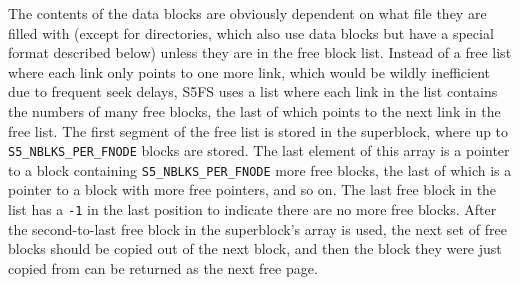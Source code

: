 The contents of the data blocks are obviously dependent on what file they are filled with (except for directories, which also use data blocks but have a special format described below) unless they are in the free block list. Instead of a free list where each link only points to one more link, which would be wildly inefficient due to frequent seek delays, S5FS uses a list where each link in the list contains the numbers of many free blocks, the last of which points to the next link in the free list. The first segment of the free list is stored in the superblock, where up to \texttt{S5\_NBLKS\_PER\_FNODE} blocks are stored. The last element of this array is a pointer to a block containing \texttt{S5\_NBLKS\_PER\_FNODE} more free blocks, the last of which is a pointer to a block with more free pointers, and so on. The last free block in the list has a \texttt{-1} in the last position to indicate there are no more free blocks. After the second-to-last free block in the superblock's array is used, the next set of free blocks should be copied out of the next block, and then the block they were just copied from can be returned as the next free page.

